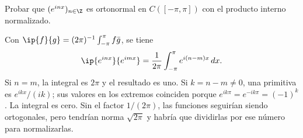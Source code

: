 \begin{ejercicio}
Probar que $(e^{inx})_{n\in\Z}$ es ortonormal en $C([-\pi,\pi])$ con el producto interno normalizado.
\end{ejercicio}
\begin{solucion}
Con $\ip{f}{g}=(2\pi)^{-1}\int_{-\pi}^{\pi}f\bar g$, se tiene
\[
 \ip{e^{inx}}{e^{imx}}=\frac1{2\pi}\int_{-\pi}^{\pi}e^{i(n-m)x}\,dx.
\]
Si $n=m$, la integral es $2\pi$ y el resultado es uno. Si $k=n-m\ne0$, una primitiva es $e^{ikx}/(ik)$; sus valores en los extremos coinciden porque $e^{ik\pi}=e^{-ik\pi}=(-1)^k$. La integral es cero. Sin el factor $1/(2\pi)$, las funciones seguirían siendo ortogonales, pero tendrían norma $\sqrt{2\pi}$ y habría que dividirlas por ese número para normalizarlas.
\end{solucion}

